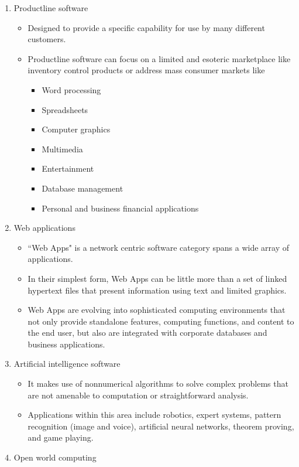 \documentclass{article}
\begin{document}
\begin{enumerate}[label=\arabic*)]
		\item Productline software
			\begin{itemize}
				\item Designed to provide a specific capability for use by many different customers.
				\item Productline software can focus on a limited and esoteric marketplace like inventory
					control products or address mass  consumer markets like
				\begin{itemize}
					\item Word processing
					\item Spreadsheets
					\item Computer graphics
					\item Multimedia
					\item Entertainment
					\item Database management
					\item Personal and business financial applications
				\end{itemize}
			\end{itemize} \newpage
		\item Web applications
			\begin{itemize}
				\item ``Web Apps" is a network centric software category spans a wide array of applications.
				\item In their simplest form, Web Apps can be little more than a set of linked hypertext files
					that present information using text and limited graphics.
				\item Web Apps are evolving into sophisticated computing environments that not only provide
					standalone features, computing functions, and content to the end user, but also are
					integrated with corporate databases and business applications.
			\end{itemize}
		\item Artificial intelligence software
			\begin{itemize}
				\item It makes use of nonnumerical algorithms to solve complex problems that are not amenable to
					computation or straightforward analysis.
				\item Applications within this area include robotics, expert systems, pattern recognition (image
					and voice), artificial neural networks, theorem proving, and game playing.
			\end{itemize}
		\item Open world computing

\end{enumerate}
\end{document}
